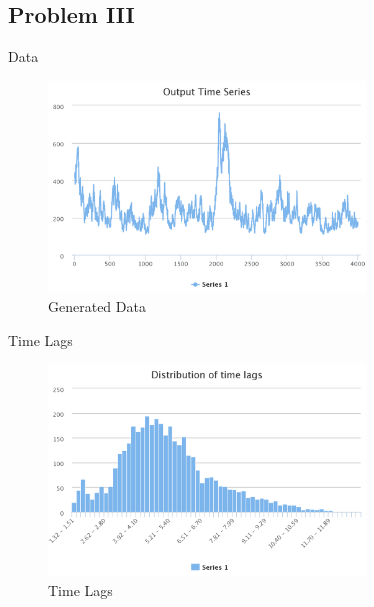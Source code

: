 \documentclass{beamer}
\begin{document}
\subsection{Problem III}

\begin{frame}{Data}
    \begin{figure}[h]
        \includegraphics[width=0.75\textwidth]{timeseries-problem-iii.png}
        \caption{Generated Data}
        \label{fig:TimeSeries-iii}
      \end{figure}
\end{frame}

\begin{frame}{Time Lags}
    \begin{figure}[h]
        \includegraphics[width=0.75\textwidth]{data-hist-problem-iii.png}
        \caption{Time Lags}
        \label{fig:TimeLags-iii}
      \end{figure}
\end{frame}
\end{document}
